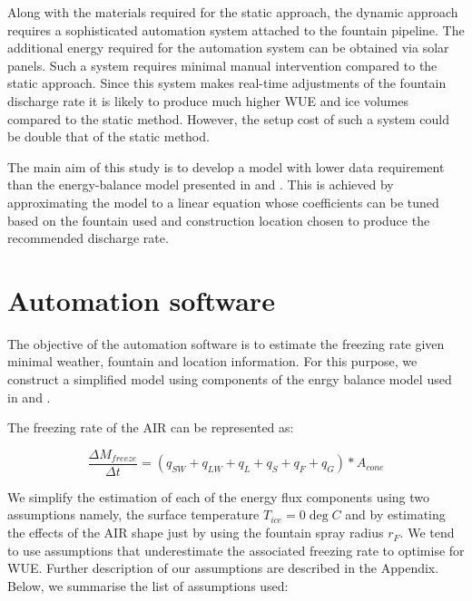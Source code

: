 \documentclass[utf8]{frontiersSCNS}
\begin{document}
Along with the materials required for the static approach, the dynamic approach requires a sophisticated
automation system attached to the fountain pipeline. The additional energy required for the automation system
can be obtained via solar panels. Such a system requires minimal manual intervention compared to the static
approach. Since this system makes real-time adjustments of the fountain discharge rate it is likely to produce
much higher WUE and ice volumes compared to the static method. However, the setup cost of such a system could be
double that of the static method.

The main aim of this study is to develop a model with lower data requirement than the energy-balance model
presented in \cite{Balasubramanian_2022} and \cite{oerlemans-brief-communication-growth-2021}. This is achieved
by approximating the model to a linear equation whose coefficients can be tuned based on the fountain used and
construction location chosen to produce the recommended discharge rate.


\section{Automation software}
The objective of the automation software is to estimate the freezing rate given minimal weather, fountain and
location information. For this purpose, we construct a simplified model using components of the enrgy balance
model used in \cite{Balasubramanian_2022} and \cite{oerlemans-brief-communication-growth-2021}. 

The freezing rate of the AIR can be represented as: 

\begin{equation}
	 \frac{\Delta M_{freeze}}{\Delta t}  = (q_{SW} + q_{LW} + q_{L} + q_{S} + q_{F} + q_{G}) * A_{cone}
	\label{eqn:freeze}
\end{equation}

We simplify the estimation of each of the energy flux components using two assumptions namely, the surface
temperature $T_{ice} = 0 \deg C$ and by estimating the effects of the AIR shape just by using the fountain spray
radius $r_F$.  We tend to use assumptions that underestimate the associated freezing rate to optimise for WUE.
Further description of our assumptions are described in the Appendix. Below, we summarise the list of
assumptions used:
\end{document}
